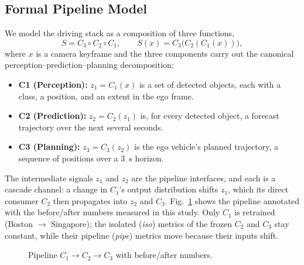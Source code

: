 \documentclass[conference]{IEEEtran}
\begin{document}
\subsection{Formal Pipeline Model}
We model the driving stack as a composition of three functions,
\begin{equation}
S = C_3 \circ C_2 \circ C_1,
\qquad
S(x) = C_3\bigl(C_2(C_1(x))\bigr),
\label{eq:comp}
\end{equation}
where $x$ is a camera keyframe and the three components carry out the
canonical perception--prediction--planning decomposition:
\begin{itemize}
\item \textbf{C1 (Perception):} $z_1 = C_1(x)$ is a set of detected objects,
each with a class, a position, and an extent in the ego frame.
\item \textbf{C2 (Prediction):} $z_2 = C_2(z_1)$ is, for every detected
object, a forecast trajectory over the next several seconds.
\item \textbf{C3 (Planning):} $z_3 = C_3(z_2)$ is the ego vehicle's planned
trajectory, a sequence of positions over a $3$~s horizon.
\end{itemize}
The intermediate signals $z_1$ and $z_2$ are the pipeline interfaces, and each
is a cascade channel: a change in $C_1$'s output distribution shifts $z_1$,
which its direct consumer $C_2$ then propagates into $z_2$ and $C_3$.
Fig.~\ref{fig:pipeline} shows the pipeline annotated with the before/after
numbers measured in this study. Only $C_1$ is retrained (Boston $\to$
Singapore); the isolated (\emph{iso}) metrics of the frozen $C_2$ and $C_3$
stay constant, while their pipeline (\emph{pipe}) metrics move because their
inputs shift.

\begin{figure}[htbp]
\centering
{}
\caption{Pipeline $C_1\!\to\!C_2\!\to\!C_3$ with before/after numbers.}
\label{fig:pipeline}
\end{figure}
\end{document}
